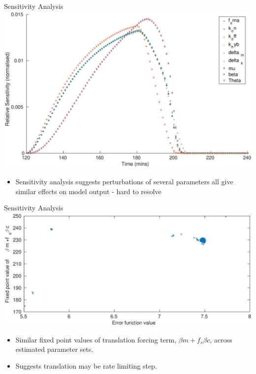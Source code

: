 \documentclass{beamer}
\begin{document}
\begin{frame}{Sensitivity Analysis}
  \includegraphics[scale = 0.22, clip = true, trim = 00 0 0 0]{../Figures/Sensitivty_scaled_other}
          \begin{itemize}
    \item Sensitivity analysis suggests perturbations of several parameters all give similar effects on model output - \alert{hard to resolve}
            \end{itemize}
\end{frame}

\begin{frame}{Sensitivity Analysis}
  \includegraphics[scale = 0.24, clip = true, trim = 0 0 0 0]{../Figures/fixedpoint_f}
\begin{itemize}
	\item Similar fixed point values of translation forcing term, ${\beta} m +{f_{s}}\beta c$, across estimated parameter sets.
	\item Suggests translation may be rate limiting step.
\end{itemize}
\end{frame}
\end{document}
